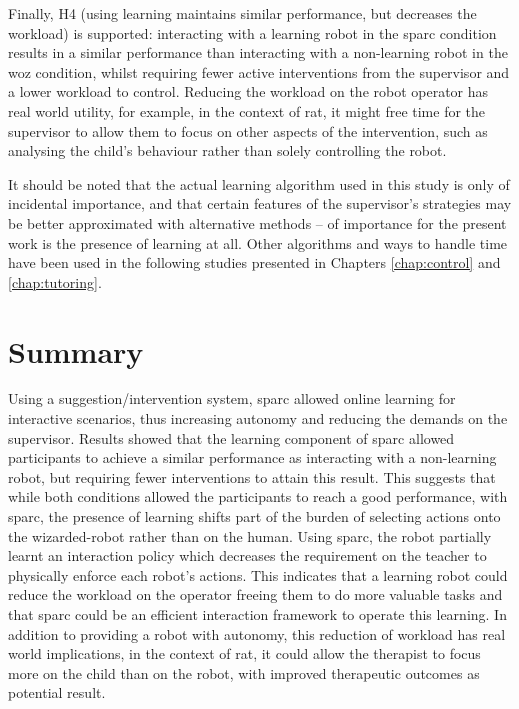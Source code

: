 Finally, H4 (using learning maintains similar performance, but decreases the workload) is supported: interacting with a learning robot in the \gls{sparc} condition results in a similar performance than interacting with a non-learning robot in the \gls{woz} condition, whilst requiring fewer active interventions from the supervisor and a lower workload to control. Reducing the workload on the robot operator has real world utility, for example, in the context of \gls{rat}, it might free time for the supervisor to allow them to focus on other aspects of the intervention, such as analysing the child's behaviour rather than solely controlling the robot. 

It should be noted that the actual learning algorithm used in this study is only of incidental importance, and that certain features of the supervisor's strategies may be better approximated with alternative methods -- of importance for the present work is the presence of learning at all. Other algorithms and ways to handle time have been used in the following studies presented in Chapters \ref{chap:control} and \ref{chap:tutoring}.

\section{Summary}


Using a suggestion/intervention system, \gls{sparc} allowed online learning for interactive scenarios, thus increasing autonomy and reducing the demands on the supervisor. Results showed that the learning component of \gls{sparc} allowed participants to achieve a similar performance as interacting with a non-learning robot, but requiring fewer interventions to attain this result. This suggests that while both conditions allowed the participants to reach a good performance, with \gls{sparc}, the presence of learning shifts part of the burden of selecting actions onto the wizarded-robot rather than on the human. Using \gls{sparc}, the robot partially learnt an interaction policy which decreases the requirement on the teacher to physically enforce each robot's actions. This indicates that a learning robot could reduce the workload on the operator freeing them to do more valuable tasks and that \gls{sparc} could be an efficient interaction framework to operate this learning. In addition to providing a robot with autonomy, this reduction of workload has real world implications, in the context of \gls{rat}, it could allow the therapist to focus more on the child than on the robot, with improved therapeutic outcomes as potential result. 

